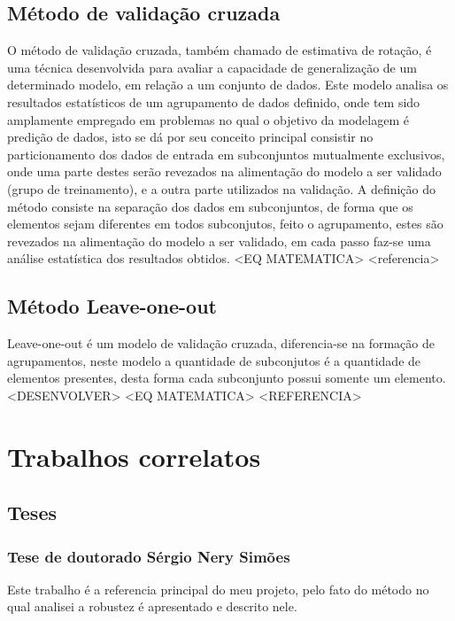 \subsection{Método de validação cruzada}
O método de validação cruzada, também chamado de estimativa de rotação, é uma técnica desenvolvida para avaliar a capacidade de generalização de um determinado modelo, em relação a um conjunto de dados. Este modelo analisa os resultados estatísticos de um agrupamento de dados definido, onde tem sido amplamente empregado em problemas no qual o objetivo da modelagem é  predição de dados, isto se dá por seu conceito principal consistir no particionamento dos dados de entrada em subconjuntos mutualmente exclusivos, onde uma parte destes serão revezados na alimentação do modelo a ser validado (grupo de treinamento), e a outra parte utilizados na validação.
A definição do método consiste na separação dos dados em subconjuntos, de forma que os elementos sejam diferentes em todos subconjutos, feito o agrupamento, estes são revezados na alimentação do modelo a ser validado, em cada passo faz-se uma análise estatística dos resultados obtidos.
<EQ MATEMATICA>
<referencia>



\subsection{Método Leave-one-out}

Leave-one-out é um modelo de validação cruzada, diferencia-se na formação de agrupamentos, neste modelo a quantidade de subconjutos é a quantidade de elementos presentes, desta forma cada subconjunto possui somente um elemento.
<DESENVOLVER>
<EQ MATEMATICA>
<REFERENCIA>


\section{Trabalhos correlatos}

\subsection{Teses}

\subsubsection{Tese de doutorado Sérgio Nery Simões}
\cite{NERI}
Este trabalho é a referencia principal do meu projeto, pelo fato do método no qual analisei a robustez é apresentado e descrito nele.

